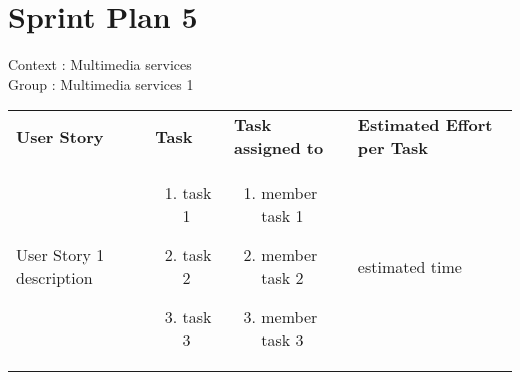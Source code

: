 \documentclass[11pt,a4paper]{article}
\begin{document}
\section*{Sprint Plan 5}
Context : Multimedia services\\
Group : Multimedia services 1\\



\begin{table}[h]
\begin{tabular}{|p{6cm}|p{5.5cm}|p{4cm}|p{3cm}|}
\textbf{User Story} & \textbf{Task} & \textbf{Task assigned to} & \textbf{Estimated Effort per Task} \\
User Story 1 description & \begin{enumerate}
\item task 1
\item task 2
\item task 3
\end{enumerate}

& 
\begin{enumerate}
\item member task 1
\item member task 2
\item member task 3
\end{enumerate}

& 
estimated time \\

           
\end{tabular}
\end{table}
\end{document}
